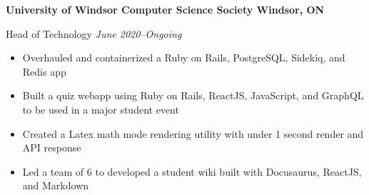 \textbf{University of Windsor Computer Science Society \hfill Windsor, ON}

Head of Technology \hfill \textit{June 2020--Ongoing}
\begin{itemize}
    \item Overhauled and containerized a Ruby on Rails, PostgreSQL, Sidekiq, and Redis app
    \item Built a quiz webapp using Ruby on Rails, ReactJS, JavaScript, and GraphQL to be used in a major student event
    \item Created a Latex math mode rendering utility with under 1 second render and API response
    \item Led a team of 6 to developed a student wiki built with Docusaurus, ReactJS, and Markdown
\end{itemize}
